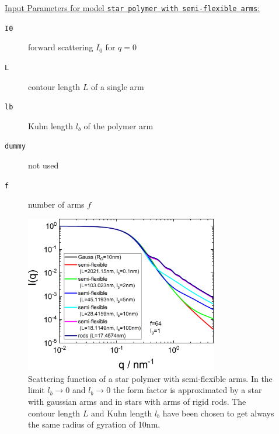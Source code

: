 \vspace{5mm}

\noindent
\underline{Input Parameters for model \texttt{star polymer with semi-flexible arms}:}
\begin{description}
\item[\texttt{I0}] forward scattering $I_0$ for $q=0$
\item[\texttt{L}] contour length $L$ of a single arm
\item[\texttt{lb}] Kuhn length $l_b$ of the polymer arm
\item[\texttt{dummy}] not used
\item[\texttt{f}] number of arms $f$
\end{description}


\begin{figure}[htb]
\begin{center}
\includegraphics[width=0.75\textwidth]{../images/form_factor/stars/StarSemiFlexibleIQ.png}
\end{center}
\caption{Scattering function of a star polymer with semi-flexible arms. In the limit $l_b\rightarrow 0$ and $l_b\rightarrow 0$ the form factor is approximated by a star with gaussian arms and in stars with arms of rigid rods. The contour length $L$ and Kuhn length $l_b$ have been chosen to get always the same radius of gyration of 10nm.} \label{fig:StarSemiFlexible_Iq}
\end{figure}


\clearpage
